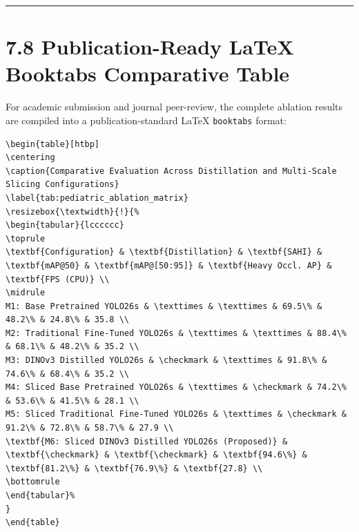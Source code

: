 \begin{center}\rule{0.5\linewidth}{0.5pt}\end{center}

\section{7.8 Publication-Ready LaTeX Booktabs Comparative
Table}\label{publication-ready-latex-booktabs-comparative-table}

For academic submission and journal peer-review, the complete ablation
results are compiled into a publication-standard LaTeX \texttt{booktabs}
format:

\begin{verbatim}
\begin{table}[htbp]
\centering
\caption{Comparative Evaluation Across Distillation and Multi-Scale Slicing Configurations}
\label{tab:pediatric_ablation_matrix}
\resizebox{\textwidth}{!}{%
\begin{tabular}{lcccccc}
\toprule
\textbf{Configuration} & \textbf{Distillation} & \textbf{SAHI} & \textbf{mAP@50} & \textbf{mAP@[50:95]} & \textbf{Heavy Occl. AP} & \textbf{FPS (CPU)} \\
\midrule
M1: Base Pretrained YOLO26s & \texttimes & \texttimes & 69.5\% & 48.2\% & 24.8\% & 35.8 \\
M2: Traditional Fine-Tuned YOLO26s & \texttimes & \texttimes & 88.4\% & 68.1\% & 48.2\% & 35.2 \\
M3: DINOv3 Distilled YOLO26s & \checkmark & \texttimes & 91.8\% & 74.6\% & 68.4\% & 35.2 \\
M4: Sliced Base Pretrained YOLO26s & \texttimes & \checkmark & 74.2\% & 53.6\% & 41.5\% & 28.1 \\
M5: Sliced Traditional Fine-Tuned YOLO26s & \texttimes & \checkmark & 91.2\% & 72.8\% & 58.7\% & 27.9 \\
\textbf{M6: Sliced DINOv3 Distilled YOLO26s (Proposed)} & \textbf{\checkmark} & \textbf{\checkmark} & \textbf{94.6\%} & \textbf{81.2\%} & \textbf{76.9\%} & \textbf{27.8} \\
\bottomrule
\end{tabular}%
}
\end{table}
\end{verbatim}
